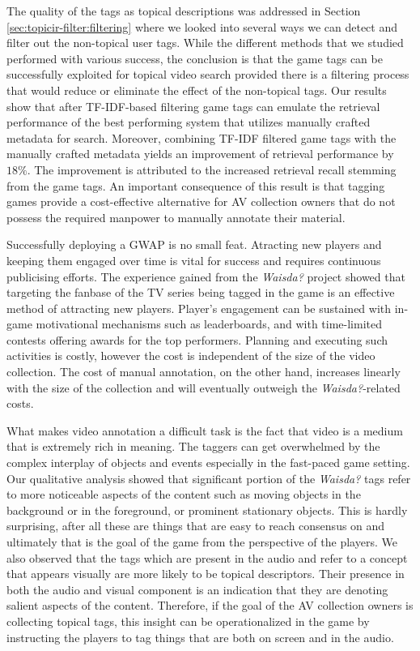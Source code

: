 The quality of the tags as topical descriptions was addressed in Section \ref{sec:topicir-filter:filtering} where we looked into several ways we can detect and filter out the non-topical user tags. While the different methods that we studied performed with various success, the conclusion is that the game tags can be successfully exploited for topical video search provided there is a filtering process that would reduce or eliminate the effect of the non-topical tags. Our results show that after TF-IDF-based filtering game tags can emulate the retrieval performance of the best performing system that utilizes manually crafted metadata for search. Moreover, combining TF-IDF filtered game tags with the manually crafted metadata  yields an improvement of retrieval performance by $18\%$. The improvement is attributed to the increased retrieval recall stemming from the game tags. An important consequence of this result is that tagging games provide a cost-effective alternative for AV collection owners that do not possess the required manpower to manually annotate their material.

Successfully deploying a GWAP is no small feat. Atracting new players and keeping them engaged over time is vital for success and requires continuous publicising efforts. The experience gained from the \textit{Waisda?} project showed that targeting the fanbase of the TV series being tagged in the game is an effective method of attracting new players. Player’s engagement can be sustained with in-game motivational mechanisms such as leaderboards, and with time-limited contests offering awards for the top performers. Planning and executing such activities is costly, however the cost is independent of the size of the video collection.  The cost of manual annotation, on the other hand, increases linearly with the size of the collection and will eventually outweigh the \textit{Waisda?}-related costs.

What makes video annotation a difficult task is the fact that video is a medium that is extremely rich in meaning. The taggers can get overwhelmed by the complex interplay of objects and events especially in the fast-paced game setting. Our qualitative analysis showed that significant portion of the \textit{Waisda?}
tags refer to more noticeable aspects of the content such as moving objects in the background or in the foreground, or prominent stationary objects. This is hardly surprising, after all these are things that are easy to reach consensus on and ultimately that is the goal of the game from the perspective of the players. We also observed that the tags which are present in the audio and refer to a concept that appears visually are more likely to be topical descriptors. Their presence in both the audio and visual component is an indication that they are denoting salient aspects of the content. Therefore, if the goal of the AV collection owners is collecting topical tags, this insight can be operationalized in the game by instructing the players to tag things that are both on screen and in the audio.

